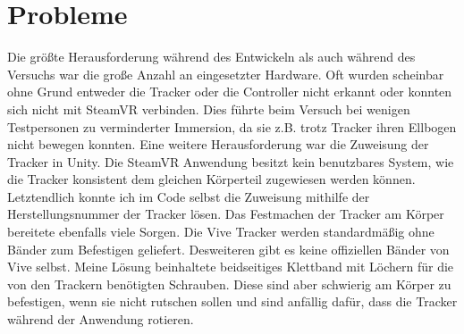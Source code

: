 \section{Probleme}
Die größte Herausforderung während des Entwickeln als auch während des Versuchs war die große Anzahl an eingesetzter Hardware. Oft wurden scheinbar ohne Grund entweder die Tracker oder die Controller nicht erkannt oder konnten sich nicht mit SteamVR verbinden. Dies führte beim Versuch bei wenigen Testpersonen zu verminderter Immersion, da sie z.B. trotz Tracker ihren Ellbogen nicht bewegen konnten. 
Eine weitere Herausforderung war die Zuweisung der Tracker in Unity. Die SteamVR Anwendung besitzt kein benutzbares System, wie die Tracker konsistent dem gleichen Körperteil zugewiesen werden können. Letztendlich konnte ich im Code selbst die Zuweisung mithilfe der Herstellungsnummer der Tracker lösen.
Das Festmachen der Tracker am Körper bereitete ebenfalls viele Sorgen. Die Vive Tracker werden standardmäßig ohne Bänder zum Befestigen geliefert. Desweiteren gibt es keine offiziellen Bänder von Vive selbst. Meine Lösung beinhaltete beidseitiges Klettband mit Löchern für die von den Trackern benötigten Schrauben. Diese sind aber schwierig am Körper zu befestigen, wenn sie nicht rutschen sollen und sind anfällig dafür, dass die Tracker während der Anwendung rotieren.
 
